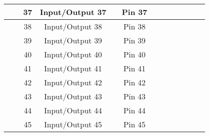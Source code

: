 \documentclass[10pt,a4paper,landscape]{article}
\begin{document}
\begin{table}[t]
{\begin{tabular}{|ccc|c|c|c|c|c|c|c|c|c|c|}
\hline
 &  & \multicolumn{1}{|c|}{37} & Input/Output 37 & & Pin 37 & & & & & & & \\
\hline
 &  & \multicolumn{1}{|c|}{38} & Input/Output 38 & & Pin 38 & & & & & & & \\
\hline
 &  & \multicolumn{1}{|c|}{39} & Input/Output 39 & & Pin 39 & & & & & & & \\
\hline
 &  & \multicolumn{1}{|c|}{40} & Input/Output 40 & & Pin 40 & & & & & & & \\
\hline
 &  & \multicolumn{1}{|c|}{41} & Input/Output 41 & & Pin 41 & & & & & & & \\
\hline
 &  & \multicolumn{1}{|c|}{42} & Input/Output 42 & & Pin 42 & & & & & & & \\
\hline
 &  & \multicolumn{1}{|c|}{43} & Input/Output 43 & & Pin 43 & & & & & & & \\
\hline
 &  & \multicolumn{1}{|c|}{44} & Input/Output 44 & & Pin 44 & & & & & & & \\
\hline
 &  & \multicolumn{1}{|c|}{45} & Input/Output 45 & & Pin 45 & & & & & & & \\
\hline

\end{tabular}
}
\end{table}
\end{document}
